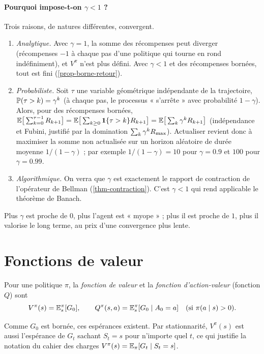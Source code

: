 \paragraph{Pourquoi impose-t-on $\gamma<1$ ?} Trois raisons, de natures différentes, convergent.
\begin{enumerate}
\item \emph{Analytique.} Avec $\gamma=1$, la somme des récompenses peut diverger (récompenses $-1$ à chaque pas d'une politique qui tourne en rond indéfiniment), et $V^\pi$ n'est plus défini. Avec $\gamma<1$ et des récompenses bornées, tout est fini (\cref{prop-borne-retour}).
\item \emph{Probabiliste.} Soit $\tau$ une variable géométrique indépendante de la trajectoire, $\P(\tau>k)=\gamma^k$ (à chaque pas, le processus « s'arrête » avec probabilité $1-\gamma$). Alors, pour des récompenses bornées, $\E\big[\sum_{k=0}^{\tau-1}R_{k+1}\big]=\E\big[\sum_{k\ge0}\1\{\tau>k\}R_{k+1}\big]=\E\big[\sum_k\gamma^kR_{k+1}\big]$ (indépendance et Fubini, justifié par la domination $\sum_k\gamma^k\Rmax$). Actualiser revient donc à maximiser la somme non actualisée sur un horizon aléatoire de durée moyenne $1/(1-\gamma)$ ; par exemple $1/(1-\gamma)=10$ pour $\gamma=0.9$ et $100$ pour $\gamma=0.99$.
\item \emph{Algorithmique.} On verra que $\gamma$ est exactement le rapport de contraction de l'opérateur de Bellman (\cref{thm-contraction}). C'est $\gamma<1$ qui rend applicable le théorème de Banach.
\end{enumerate}
Plus $\gamma$ est proche de $0$, plus l'agent est « myope » ; plus il est proche de $1$, plus il valorise le long terme, au prix d'une convergence plus lente.

\section{Fonctions de valeur}\label{sec-valeurs}

\begin{definition}
Pour une politique $\pi$, la \emph{fonction de valeur} et la \emph{fonction d'action-valeur} (fonction $Q$) sont
\[
V^\pi(s)=\E^\pi_s[G_0],\qquad
Q^\pi(s,a)=\E^\pi_s[G_0\mid A_0=a]\quad(\text{si }\pi(a\mid s)>0).
\]
\end{definition}

Comme $G_0$ est bornée, ces espérances existent. Par stationnarité, $V^\pi(s)$ est aussi l'espérance de $G_t$ sachant $S_t=s$ pour n'importe quel $t$, ce qui justifie la notation du cahier des charges $V^\pi(s)=\E_\pi[G_t\mid S_t=s]$.

